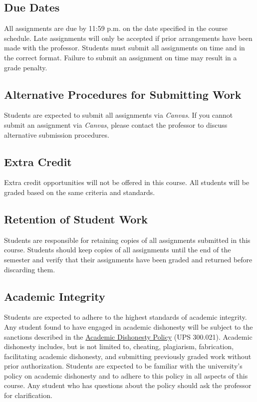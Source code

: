 \documentclass[11pt, letterpaper]{article}
\begin{document}
\subsection*{Due Dates}
All assignments are due by 11:59 p.m. on the date specified in the course schedule. Late assignments will only be accepted if prior arrangements have been made with the professor. Students must submit all assignments on time and in the correct format. Failure to submit an assignment on time may result in a grade penalty.

\subsection*{Alternative Procedures for Submitting Work}
Students are expected to submit all assignments via \emph{Canvas}. If you cannot submit an assignment via \emph{Canvas}, please contact the professor to discuss alternative submission procedures.

\subsection*{Extra Credit}
Extra credit opportunities will not be offered in this course. All students will be graded based on the same criteria and standards.

\subsection*{Retention of Student Work}
Students are responsible for retaining copies of all assignments submitted in this course. Students should keep copies of all assignments until the end of the semester and verify that their assignments have been graded and returned before discarding them.

\subsection*{Academic Integrity}
Students are expected to adhere to the highest standards of academic integrity. Any student found to have engaged in academic dishonesty will be subject to the sanctions described in the \href{https://www.fullerton.edu/senate/publications_policies_resolutions/ups/UPS%20300/UPS%20300.021.pdf}{Academic Dishonesty Policy} (UPS 300.021). Academic dishonesty includes, but is not limited to, cheating, plagiarism, fabrication, facilitating academic dishonesty, and submitting previously graded work without prior authorization. Students are expected to be familiar with the university's policy on academic dishonesty and to adhere to this policy in all aspects of this course. Any student who has questions about the policy should ask the professor for clarification.
\end{document}
